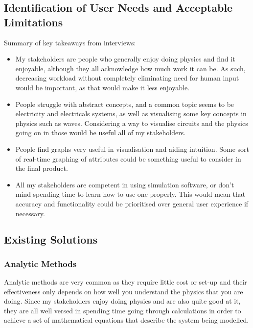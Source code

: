 \documentclass[11pt]{article}
\begin{document}
        \subsection{Identification of User Needs and Acceptable Limitations}
            Summary of key takeaways from interviews:
            \begin{itemize}
                \item My stakeholders are people who generally enjoy doing physics and find it enjoyable, although they all acknowledge how much work it can be. As such, decreasing workload without completely eliminating need for human input would be important, as that would make it less enjoyable.
                \item People struggle with abstract concepts, and a common topic seems to be electricity and electricals systems, as well as visualising some key concepts in physics such as waves. Considering a way to visualise circuits and the physics going on in those would be useful all of my stakeholders.
                \item People find graphs very useful in visualisation and aiding intuition. Some sort of real-time graphing of attributes could be something useful to consider in the final product.
                \item All my stakeholders are competent in using simulation software, or don't mind spending time to learn how to use one properly. This would mean that accuracy and functionality could be prioritised over general user experience if necessary. 
            \end{itemize}

        \subsection{Existing Solutions}

            \subsubsection{Analytic Methods}
                Analytic methods are very common as they require little cost or set-up and their effectiveness only depends on how well you understand the physics that you are doing. Since my stakeholders enjoy doing physics and are also quite good at it, they are all well versed in spending time going through calculations in order to achieve a set of mathematical equations that describe the system being modelled. 
\end{document}
